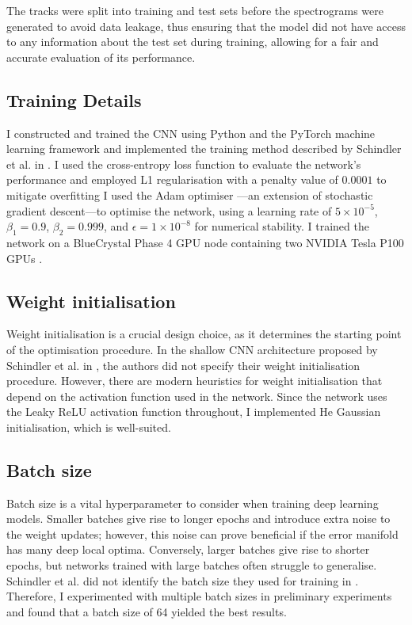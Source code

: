 \documentclass[conference]{IEEEtran}
\begin{document}
The tracks were split into training and test sets before the spectrograms were generated to avoid data leakage, thus ensuring that the model did not have access to any information about the test set during training, allowing for a fair and accurate evaluation of its performance.

\subsection{Training Details}

I constructed and trained the CNN using Python and the PyTorch \cite{PyTorch} machine learning framework and implemented the training method described by Schindler et al. in \cite{SchindlerLidyRauber}.
I used the cross-entropy loss function to evaluate the network's performance and employed L1 regularisation with a penalty value of $0.0001$ to mitigate overfitting
I used the Adam optimiser \cite{KingmaBa}---an extension of stochastic gradient descent---to optimise the network, using a learning rate of $5\times10^{-5}$, $\beta_1=0.9$, $\beta_2=0.999$, and $\epsilon=1\times10^{-8}$ for numerical stability.
I trained the network on a BlueCrystal Phase 4 GPU node containing two NVIDIA Tesla P100 GPUs \cite{bc4}.

\subsection{Weight initialisation}

Weight initialisation is a crucial design choice, as it determines the starting point of the optimisation procedure.
In the shallow CNN architecture proposed by Schindler et al. in \cite{SchindlerLidyRauber}, the authors did not specify their weight initialisation procedure.
However, there are modern heuristics for weight initialisation that depend on the activation function used in the network.
Since the network uses the Leaky ReLU activation function throughout, I implemented He Gaussian initialisation, which is well-suited.

\subsection{Batch size}

Batch size is a vital hyperparameter to consider when training deep learning models.
Smaller batches give rise to longer epochs and introduce extra noise to the weight updates; however, this noise can prove beneficial if the error manifold has many deep local optima.
Conversely, larger batches give rise to shorter epochs, but networks trained with large batches often struggle to generalise.
Schindler et al. did not identify the batch size they used for training in \cite{SchindlerLidyRauber}.
Therefore, I experimented with multiple batch sizes in preliminary experiments and found that a batch size of 64 yielded the best results.
\end{document}

